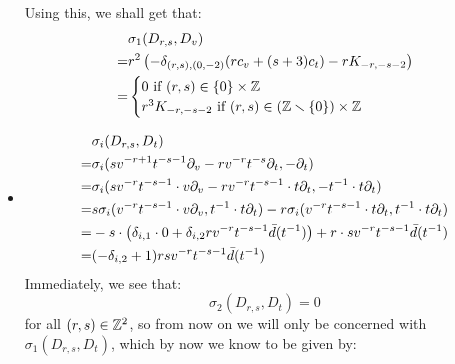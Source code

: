 \begin{example}
\begin{itemize}
                Using this, we shall get that:
                    $$
                        \begin{aligned}
                            & \sigma_1(D_{r, s}, D_v)
                            \\
                            = & r^2 \left( -\delta_{(r, s), (0, -2)} ( r c_v + (s + 3) c_t ) - r K_{-r, -s - 2} \right)
                            \\
                            = &
                            \begin{cases}
                                \text{$0$ if $(r, s) \in \{0\} \x \Z$}
                                \\
                                \text{$r^3 K_{-r, -s - 2}$ if $(r, s) \in (\Z \setminus \{0\}) \x \Z$}
                            \end{cases}
                        \end{aligned}
                    $$
                \item
                    $$
                        \begin{aligned}
                            & \sigma_i(D_{r, s}, D_t)
                            \\
                            = & \sigma_i( s v^{-r + 1} t^{-s - 1} \partial_v - r v^{-r} t^{-s} \partial_t, -\partial_t )
                            \\
                            = & \sigma_i( s v^{-r} t^{-s - 1} \cdot v \partial_v - r v^{-r} t^{-s - 1} \cdot t \partial_t, -t^{-1} \cdot t\partial_t )
                            \\
                            = & s \sigma_i( v^{-r} t^{-s - 1} \cdot v \partial_v, t^{-1} \cdot t\partial_t ) - r\sigma_i( v^{-r} t^{-s- 1} \cdot t \partial_t, t^{-1} \cdot t\partial_t )
                            \\
                            = & -s \cdot \left( \delta_{i, 1} \cdot 0 + \delta_{i, 2} r v^{-r} t^{-s - 1} \bar{d}(t^{-1}) \right) + r \cdot s v^{-r} t^{-s - 1} \bar{d}(t^{-1})
                            \\
                            = & (-\delta_{i, 2} + 1) rs v^{-r} t^{-s - 1} \bar{d}(t^{-1})
                        \end{aligned}
                    $$
                Immediately, we see that:
                    $$\sigma_2(D_{r, s}, D_t) = 0$$
                for all $(r, s) \in \mathbb{Z}^2$, so from now on we will only be concerned with $\sigma_1(D_{r, s}, D_t)$, which by now we know to be given by:

\end{itemize}
\end{example}
